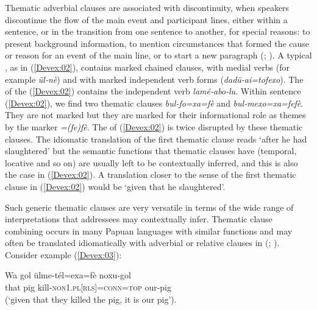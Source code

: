 \documentclass[output=paper]{LSP/langsci}
\begin{document}
Thematic adverbial clauses are associated with discontinuity, when speakers discontinue the flow of the main event and participant lines, either within a sentence, or in the transition from one sentence to another, for special reasons: to present background information, to mention circumstances that formed the cause or reason for an event of the main line, or to start a new paragraph (\citealt[][337, 363]{farr99}; \citealt[][373]{devries.2005}). A typical  , as in (\ref{Devex:02}), contains  marked chained clauses, with medial verbs (for example \textit{ül‑nè}) and with  marked independent verb forms (\textit{dadü-ai=tofexo}). The  of the  (\ref{Devex:02}) contains the independent verb \textit{lamé‑abo‑lu}. Within  sentence  (\ref{Devex:02}), we find two thematic clauses \textit{bul‑fo=xa=fè} and \textit{bul‑mexo=xa=fefè}. They are not  marked but they are marked for their informational role as themes by the  marker \textit{=(fe)fè}. The  of (\ref{Devex:02}) is twice disrupted by these thematic clauses. The idiomatic translation of the first thematic clause reads ‘after he had slaughtered’ but the semantic functions that thematic clauses have (temporal, locative and so on) are usually left to be contextually inferred, and this is also the case in (\ref{Devex:02}). A translation closer to the sense of the first thematic clause in (\ref{Devex:02}) would be `given that he slaughtered'. 

Such generic thematic clauses are very versatile in terms of the wide range of interpretations that addressees may contextually infer. Thematic clause combining occurs in many Papuan languages with similar functions and may often be translated idiomatically with adverbial or relative clauses in  (\citealt{haiman.1978,reesink94,Heeschen98}; \citealt[][201]{foley86}). Consider example (\ref{Devex:03}):

\begin{exe}
\ex \label{Devex:03}
\gll Wa gol ülme-tél=exa=fè noxu-gol\\	
that pig  kill-\textsc{non1.pl}[\textsc{rls}]=\textsc{conn}=\textsc{top} our-pig\\
\glt {} (`given that they killed the pig, it is our pig').\\
\end{exe}
\end{document}
